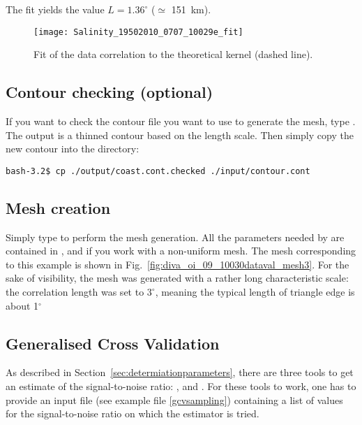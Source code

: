 The fit yields the value $L=1.36^{\circ}$ ($\simeq$ 151~km).

\begin{figure}[h!]
\centering
\texttt{[image: Salinity\_19502010\_0707\_10029e\_fit]}
\caption[Fit of the data correlation to the theoretical kernel.]{Fit of the data correlation to the theoretical kernel (dashed line). \label{fig:Salinity_19502010_0707_10029e_fit}}
\end{figure}



\subsection[Contour checking]{Contour checking (optional)}

If you want to check the contour file you want to use to generate the mesh, type . The output  is a thinned contour based on the length scale.
Then simply copy the new contour into the  directory:

\begin{lstlisting}[style=Bash]
bash-3.2$ cp ./output/coast.cont.checked ./input/contour.cont
\end{lstlisting}


\subsection{Mesh creation}

Simply type  to perform the mesh generation. All the parameters needed by \diva are contained in ,  and  if you work with a non-uniform mesh.
The mesh corresponding to this example is shown in Fig.~\ref{fig:diva_oi_09_10030dataval_mesh3}. For the sake of visibility, the mesh was generated with a rather long characteristic scale: the correlation length was set to $3^{\circ}$, meaning the typical length of triangle edge is about 1$^{\circ}$


\subsection{Generalised Cross Validation}

As described in Section~\ref{sec:determiationparameters}, there are three tools to get an estimate of the signal-to-noise ratio: ,  and .
For these tools to work, one has to provide an input file  (see example file \ref{gcvsampling}) containing a list of values for the signal-to-noise ratio on which the estimator is tried.

